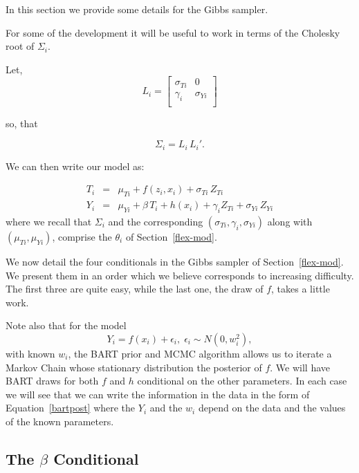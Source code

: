 In this section we provide some details for the Gibbs sampler.

For some of the development it will be useful to work in terms of the Cholesky root of 
$\Sigma_i$.

Let,
\begin{equation*}
L_i = \left[\begin{array}{cc}
\label{eq:L}
 \sigma_{Ti}  &  0\\
 \gamma_i & \sigma_{Yi}\\
 \end{array}\right]
\end{equation*}

so, that

$$
\Sigma_i = L_i \, L_i'.
$$

We can then write our model as:

\begin{eqnarray}\label{nliniv}
T_i & = & \mu_{Ti} + f(z_i,x_i) + \sigma_{Ti} \, Z_{Ti} \label{Liv1} \\
Y_i & = & \mu_{Yi} + \beta \, T_i + h(x_i) + \gamma_i Z_{Ti} + \sigma_{Yi} \, Z_{Yi} \label{Liv2}
\end{eqnarray}
where we recall that $\Sigma_i$ and the corresponding $(\sigma_{Ti}, \gamma_i, \sigma_{Yi})$ along with 
$(\mu_{Ti}, \mu_{Yi})$,  comprise the $\theta_i$ of Section~\ref{flex-mod}.

We now detail the four conditionals in the Gibbs sampler of Section~\ref{flex-mod}.
We present them in an order which we believe corresponds to increasing difficulty.
The first three are quite easy, while the last one, the draw of $f$, takes a little work.

Note also that for the model
\begin{equation}\label{bartpost}
Y_i = f(x_i) + \epsilon_i, \; \epsilon_i \sim N(0,w_i^2),
\end{equation}
with known $w_i$,
the BART prior and MCMC algorithm allows us to iterate a Markov Chain whose stationary distribution
the posterior of $f$.
We will have BART draws for both $f$ and $h$ conditional on the other parameters.
In each case we will see that we can write the information in the data in the form of 
Equation~\ref{bartpost} where the $Y_i$ and the $w_i$ depend on the data and the values of the
known parameters.

\subsection{The $\beta$ Conditional}\label{betacond}

